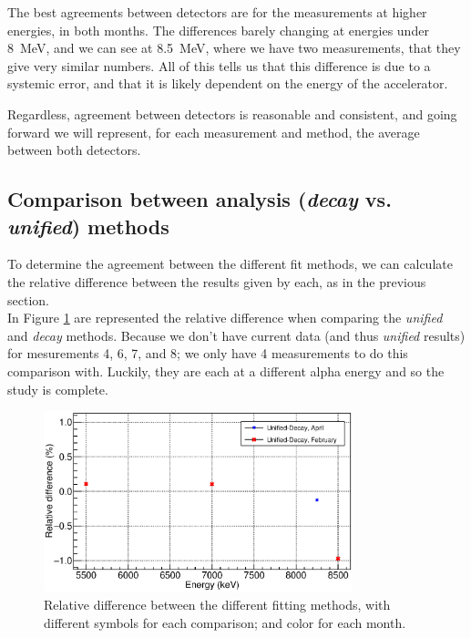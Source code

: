 \documentclass[a4paper,12pt]{report}
\begin{document}
The best agreements between detectors are for the measurements at higher energies, in both months.
The differences barely changing at energies under \qty{8}{\MeV}, and we can see at \qty{8.5}{\MeV}, where we have two measurements, that they give very similar numbers.
All of this tells us that this difference is due to a systemic error, and that it is likely dependent on the energy of the accelerator.

Regardless, agreement between detectors is reasonable and consistent, and going forward we will represent, for each measurement and method, the average between both detectors.

\subsection{Comparison between analysis (\textit{decay} vs. \textit{unified}) methods}
To determine the agreement between the different fit methods, we can calculate the relative difference between the results given by each, as in the previous section.
\\

In Figure \ref{activation_method_comparison} are represented the relative difference when comparing the \textit{unified} and \textit{decay} methods.
Because we don't have current data (and thus \textit{unified} results) for mesurements 4, 6, 7, and 8; we only have 4 measurements to do this comparison with.
Luckily, they are each at a different alpha energy and so the study is complete.

\begin{figure}[H]
	\centering
	\includegraphics[width=0.80\textwidth]{activation_method_comparison.eps}
	\caption{Relative difference between the different fitting methods, with different symbols for each comparison; and color for each month.}
	\label{activation_method_comparison}
\end{figure}
\end{document}
